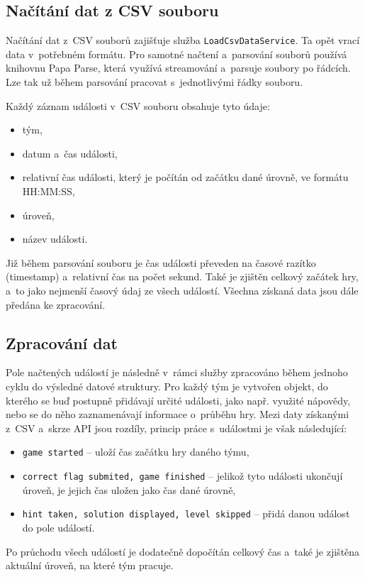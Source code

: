 \documentclass[
  digital, %
  oneside, %
  table,   %
  nolof,     %
  nolot,     %
]{fithesis3}
\begin{document}
\subsection{Načítání dat z CSV souboru}
Načítání dat z~CSV souborů zajišťuje služba \verb|LoadCsvDataService|. Ta opět vrací data v~potřebném formátu. Pro samotné načtení a~parsování souborů používá knihovnu Papa Parse, která využívá streamování a~parsuje soubory po řádcích. Lze tak už během parsování pracovat s~jednotlivými řádky souboru.\par
Každý záznam události v~CSV souboru obsahuje tyto údaje:
\begin{itemize}
  \item tým, 
  \item datum a~čas události,
  \item relativní čas události, který je počítán od začátku dané úrovně, ve formátu HH:MM:SS,
  \item úroveň,
  \item název události.
\end{itemize}
Již během parsování souboru je čas události převeden na časové razítko (timestamp) a~relativní čas na počet sekund. Také je zjištěn celkový začátek hry, a~to jako nejmenší časový údaj ze všech událostí. Všechna získaná data jsou dále předána ke zpracování.

\subsection{Zpracování dat}
Pole načtených událostí je následně v~rámci služby zpracováno během jednoho cyklu do výsledné datové struktury. Pro každý tým je vytvořen objekt, do kterého se buď postupně přidávají určité události, jako např. využité nápovědy, nebo se do něho zaznamenávají informace o~průběhu hry. Mezi daty získanými z~CSV a~skrze API jsou rozdíly, princip práce s~událostmi je však následující:
\begin{itemize}
  \item \verb|game started| – uloží čas začátku hry daného týmu,
  \item \verb|correct flag submited, game finished| – jelikož tyto události ukončují úroveň, je jejich čas uložen jako čas dané úrovně,
  \item \verb|hint taken, solution displayed, level skipped| – přidá danou událost do pole událostí.
\end{itemize}
Po průchodu všech událostí je dodatečně dopočítán celkový čas a~také je zjištěna aktuální úroveň, na které tým pracuje.
\end{document}
